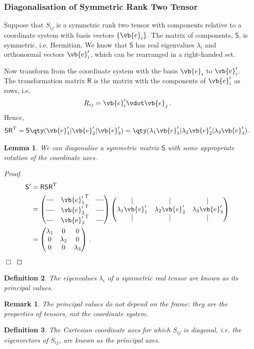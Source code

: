 \documentclass{article}
\theoremstyle{plain}\theoremheaderfont{\normalfont\itshape}\theorembodyfont{\rmfamily}\theoremseparator{.}\newtheorem*{rem}{Remark}\newtheorem*{ex}{Example}\newtheorem*{proof}{Proof}\newtheorem*{altp}{Alternative proof}
\theoremstyle{plain}\theoremheaderfont{\normalfont\bfseries}\theorembodyfont{\rmfamily}\theoremseparator{.}\newtheorem{thm}{Theorem}[section]\newtheorem{lem}[thm]{Lemma}\newtheorem{prop}[thm]{Proposition}\newtheorem*{cor}{Corollary}\newtheorem{defn}[thm]{Definition}\newtheorem{clm}[thm]{Claim}\newtheorem{clminproof}{Claim}
\theoremstyle{break}\theoremheaderfont{\normalfont\itshape}\theorembodyfont{\rmfamily}\theoremseparator{.\medskip}\newtheorem*{proofskip}{Proof}\newtheorem*{exs}{Examples}\newtheorem*{rems}{Remarks}
\theoremstyle{break}\theoremheaderfont{\normalfont\bfseries}\theorembodyfont{\rmfamily}\theoremseparator{.\medskip}\newtheorem{lemskip}[thm]{Lemma}\newtheorem{defnskip}[thm]{Definition}\newtheorem{propskip}[thm]{Proposition}\newtheorem{thmskip}[thm]{Theorem}
\numberwithin{equation}{section}
\newcommand{\qed}{\hfill\ensuremath{\Box}}
\newcommand{\tp}{^\mathrm{T}}
\begin{document}
	\subsubsection{Diagonalisation of Symmetric Rank Two Tensor}
	Suppose that \(S_{ij}\) is a symmetric rank two tensor with components relative to a coordinate system with basis vectors \(\{\vb{e}_i\}\). The matrix of components, \(\mathsf{S}\), is symmetric, i.e. Hermitian. We know that \(\mathsf{S}\) has real eigenvalues \(\lambda_i\) and orthonormal vectors \(\vb{e}_i'\), which can be rearranged in a right-handed set.

	Now transform from the coordinate system with the basis \(\vb{e}_i\) to \(\vb{e}'_i\). The transformation matrix \(\mathsf{R}\) is the matrix with the components of \(\vb{e}'_i\) as rows, i.e.
	\[R_{ij}=\vb{e}'_i\vdot\vb{e}_j\,.\]
	Hence,
	\[\mathsf{SR}\tp=\mathsf{S}\qty(\vb{e}'_1 | \vb{e}'_2 | \vb{e}'_3)=\qty(\lambda_1\vb{e}'_1 | \lambda_2\vb{e}'_2 | \lambda_3\vb{e}'_3)\,.\]
	\begin{lem}
		We can diagonalise a symmetric matrix \(\mathsf{S}\) with some appropriate rotation of the coordinate axes.
	\end{lem}
	\begin{proof}
		\begin{align*}
			\mathsf{S}'&=\mathsf{RSR}\tp\\
			&=\begin{pmatrix}
				\textbf{---} & {\vb{e}'_1}\tp & \textbf{---}\\
				\textbf{---} & {\vb{e}'_2}\tp & \textbf{---}\\
				\textbf{---} & {\vb{e}'_3}\tp & \textbf{---}
			\end{pmatrix}\begin{pmatrix}
				| & | & | \\
				\lambda_1 \vb{e}'_1 & \lambda_2 \vb{e}'_2 & \lambda_3 \vb{e}'_3\\
				| & | & |
			\end{pmatrix}\\
			&=\begin{pmatrix}
				\lambda_1 & 0 & 0\\
				0 & \lambda_2 & 0\\
				0 & 0 & \lambda_3
			\end{pmatrix}\,.
		\end{align*}\qed
	\end{proof}
	\begin{defn}
		The eigenvalues \(\lambda_i\) of a symmetric real tensor are known as its \textit{principal values}.
	\end{defn}
	\begin{rem}
		The principal values do not depend on the frame: they are the properties of tensors, not the coordinate system.
	\end{rem}
	\begin{defn}
		The Cartesian coordinate axes for which \(S_{ij}\) is diagonal, i.e. the eigenvectors of \(S_{ij}\), are known as the \textit{principal axes}.
	\end{defn}
\end{document}
